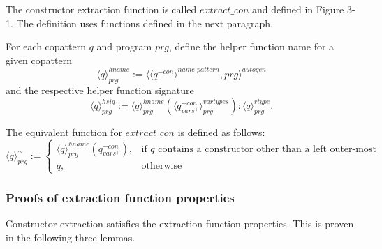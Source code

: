 The constructor extraction function is called $extract\_con$ and defined in Figure 3-1. The definition uses functions defined in the next paragraph.

For each copattern $q$ and program $prg$, define the helper function name for a given copattern
\begin{equation*}
\langle q \rangle^{hname}_{prg} := \langle \langle q^{-con} \rangle^{name\_pattern}, prg \rangle^{autogen}
\end{equation*}
and the respective helper function signature
\begin{equation*}
\langle q \rangle^{hsig}_{prg} := \langle q \rangle^{hname}_{prg}(\langle q^{-con}_{vars^+} \rangle^{vartypes}_{prg}): \langle q \rangle^{rtype}_{prg}.
\end{equation*}

The equivalent function for $extract\_con$ is defined as follows:
\[
    \langle q \rangle^{\sim}_{prg} :=
\begin{cases}
    \langle q \rangle^{hname}_{prg}(q^{-con}_{vars^+}),& \text{if $q$ contains a constructor other than a left outer-most} \\
    q,                                                                                      & \text{otherwise}
\end{cases}
\]

\subsubsection{Proofs of extraction function properties}

Constructor extraction satisfies the extraction function properties. This is proven in the following three lemmas.


